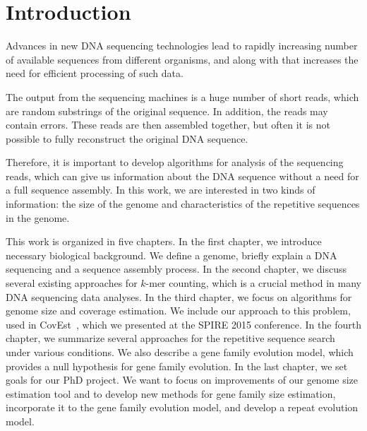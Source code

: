 \chapter*{Introduction}

Advances in new DNA sequencing technologies lead to rapidly increasing number of available sequences from different organisms, and along with that increases the need for efficient processing of such data.

The output from the sequencing machines is a huge number of short reads, which are random substrings of the original sequence. In addition, the reads may contain errors.
These reads are then assembled together, but often it is not possible to fully reconstruct the original DNA sequence.

Therefore, it is important to develop algorithms for analysis of the sequencing reads, which can give us information about the DNA sequence without a need for a full sequence assembly.
In this work, we are interested in two kinds of information: the size of the genome and characteristics of the repetitive sequences in the genome.

This work is organized in five chapters.
In the first chapter, we introduce necessary biological background. We define a genome, briefly explain a DNA sequencing and a sequence assembly process.
In the second chapter, we discuss several existing approaches for $k$-mer counting, which is a crucial method in many DNA sequencing data analyses.
In the third chapter, we focus on algorithms for genome size and coverage estimation. We include our approach to this problem, used in CovEst~\cite{covest}, which we presented at the SPIRE 2015 conference.
In the fourth chapter, we summarize several approaches for the repetitive sequence search under various conditions. We also describe a gene family evolution model, which provides a null hypothesis for gene family evolution.
In the last chapter, we set goals for our PhD project. We want to focus on improvements of our genome size estimation tool and to develop new methods for gene family size estimation, incorporate it to the gene family evolution model, and develop a repeat evolution model.
